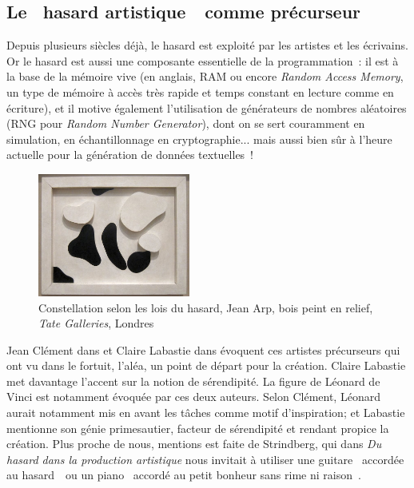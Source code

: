 \documentclass{article}
\begin{document}
		\subsection{Le \guillemotleft~hasard artistique~\guillemotright~comme précurseur}
			Depuis plusieurs siècles déjà, le hasard est exploité par les artistes et les écrivains. Or le hasard est aussi une composante essentielle de la programmation : il est à la base de la mémoire vive (en anglais, RAM ou encore \textit{Random Access Memory}, un type de mémoire à accès très rapide et temps constant en lecture comme en écriture), et il motive également l'utilisation de générateurs de nombres aléatoires (RNG pour \textit{Random Number Generator}), dont on se sert couramment en simulation, en échantillonnage en cryptographie... mais aussi bien sûr à l'heure actuelle pour la génération de données textuelles !
			\begin{figure}[H]
				\centering
				\includegraphics[width=5cm]{arp_hasard.jpg}
				\caption{Constellation selon les lois du hasard, Jean Arp, bois peint en relief, \textit{Tate Galleries}, Londres}
			\end{figure}
			
			Jean Clément dans \autocite{clement2011} et Claire Labastie dans \autocite{labastie2016} évoquent ces artistes précurseurs qui ont vu dans le fortuit, l'aléa, un point de départ pour la création. Claire Labastie met davantage l'accent sur la notion de sérendipité. La figure de Léonard de Vinci est notamment évoquée par ces deux auteurs. Selon Clément, Léonard aurait notamment mis en avant les tâches comme motif d'inspiration; et Labastie mentionne son génie primesautier, facteur de sérendipité et rendant propice la création. Plus proche de nous, mentions est faite de Strindberg, qui dans \textit{Du hasard dans la production artistique} \autocite{strindberg1990} nous invitait à utiliser une guitare \guillemotleft~accordée au hasard~\guillemotright~ou un piano \guillemotleft~accordé au petit bonheur sans rime ni raison~\guillemotright.\\
					
\end{document}
